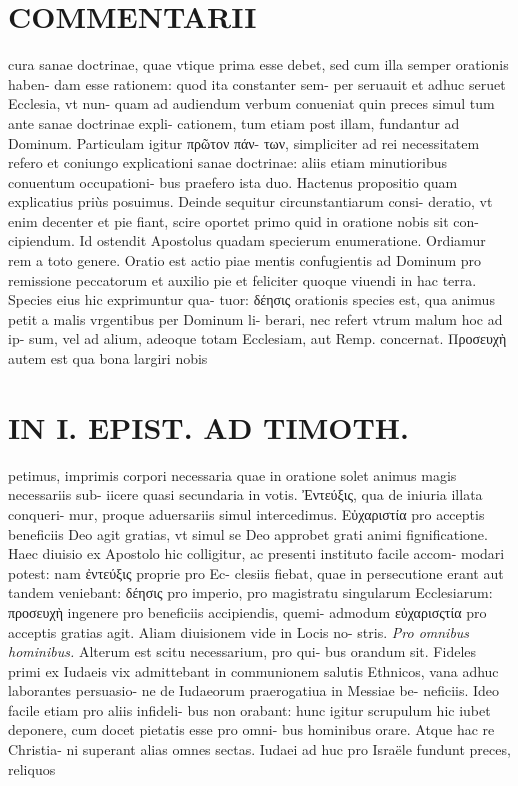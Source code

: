 \documentclass{article}
\begin{document}
\begin{pages}
\section*{COMMENTARII }
\marginpar{[ p.44 ]}\pstart cura sanae doctrinae, quae vtique prima esse debet, sed cum illa semper orationis haben- dam esse rationem: quod ita constanter sem- per seruauit et adhuc seruet Ecclesia, vt nun- quam ad audiendum verbum conueniat quin preces simul tum ante sanae doctrinae expli- cationem, tum etiam post illam, fundantur ad Dominum. Particulam igitur πρῶτον πάν- των, simpliciter ad rei necessitatem refero et coniungo explicationi sanae doctrinae: aliis etiam minutioribus conuentum occupationi- bus praefero ista duo. Hactenus propositio quam explicatius priùs posuimus.  \pend\pstart Deinde sequitur circunstantiarum consi- deratio, vt enim decenter et pie fiant, scire oportet primo quid in oratione nobis sit con- cipiendum. Id ostendit Apostolus quadam specierum enumeratione. Ordiamur rem a toto genere.  \pend\pstart Oratio est actio piae mentis confugientis ad Dominum pro remissione peccatorum et auxilio pie et feliciter quoque viuendi in hac terra. Species eius hic exprimuntur qua- tuor: δέησις orationis species est, qua animus petit a malis vrgentibus per Dominum li- berari, nec refert vtrum malum hoc ad ip- sum, vel ad alium, adeoque totam Ecclesiam, aut Remp. concernat. Προσευχὴ autem est qua bona largiri nobis  \pend
\section*{IN I. EPIST. AD TIMOTH. }
\marginpar{[ p.45 ]}\pstart petimus, imprimis corpori necessaria quae in oratione solet animus magis necessariis sub- iicere quasi secundaria in votis.  \pend\pstart Ἐντεύξις, qua de iniuria illata conqueri- mur, proque aduersariis simul intercedimus. Εὐχαριστία pro acceptis beneficiis Deo agit gratias, vt simul se Deo approbet grati animi fignificatione. Haec diuisio ex Apostolo hic colligitur, ac presenti instituto facile accom- modari potest: nam ἐντεύξις proprie pro Ec- clesiis fiebat, quae in persecutione erant aut tandem veniebant: δέησις pro imperio, pro magistratu singularum Ecclesiarum: προσευχὴ ingenere pro beneficiis accipiendis, quemi- admodum εὐχαρισςτία pro acceptis gratias agit. Aliam diuisionem vide in Locis no- stris.  \pend
\textit{Pro omnibus hominibus. }\pstart Alterum est scitu necessarium, pro qui- bus orandum sit. Fideles primi ex Iudaeis vix admittebant in communionem salutis Ethnicos, vana adhuc laborantes persuasio- ne de Iudaeorum praerogatiua in Messiae be- neficiis. Ideo facile etiam pro aliis infideli- bus non orabant: hunc igitur scrupulum hic iubet deponere, cum docet pietatis esse pro omni- bus hominibus orare. Atque hac re Christia- ni superant alias omnes sectas. Iudaei ad huc pro Israële fundunt preces, reliquos  \pend
\marginpar{[ p.46 ]}

\end{pages}
\end{document}
